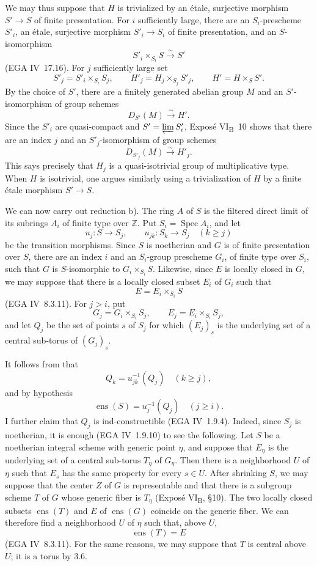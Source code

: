We may thus suppose that \(H\) is trivialized by an étale,
surjective morphism \(S'\to S\) of finite presentation. For \(i\)
sufficiently large, there are an \(S_i\)-prescheme \(S'_i\), an
étale, surjective morphism \(S'_i\to S_i\) of finite presentation,
and an \(S\)-isomorphism
\[
  S'_i\times_{S_i}S\xrightarrow{\sim}S'
\]
(EGA IV~17.16). For \(j\) sufficiently large set
\[
  S'_j=S'_i\times_{S_i}S_j,\qquad
  H'_j=H_j\times_{S_j}S'_j,\qquad
  H'=H\times_S S'.
\]
By the choice of \(S'\), there are a finitely generated abelian
group \(M\) and an \(S'\)-isomorphism of group schemes
\[
  D_{S'}(M)\xrightarrow{\sim}H'.
\]
Since the \(S'_i\) are quasi-compact and
\(S'=\varprojlim S'_i\), Exposé VI\textsubscript{B}~10 shows that
there are an index \(j\) and an \(S'_j\)-isomorphism of group
schemes
\[
  D_{S'_j}(M)\xrightarrow{\sim}H'_j.
\]
This says precisely that \(H_j\) is a quasi-isotrivial group of
multiplicative type. When \(H\) is isotrivial, one argues similarly
using a trivialization of \(H\) by a finite étale morphism
\(S'\to S\).

We can now carry out reduction b). The ring \(A\) of \(S\) is the
filtered direct limit of its subrings \(A_i\) of finite type over
\(\mathbb Z\). Put \(S_i=\operatorname{Spec}A_i\), and let
\[
  u_j:S\longrightarrow S_j,\qquad
  u_{jk}:S_k\longrightarrow S_j\quad(k\geq j)
\]
be the transition morphisms. Since \(S\) is noetherian and \(G\) is
of finite presentation over \(S\), there are an index \(i\) and an
\(S_i\)-group prescheme \(G_i\), of finite type over \(S_i\), such
that \(G\) is \(S\)-isomorphic to \(G_i\times_{S_i}S\). Likewise,
since \(E\) is locally closed in \(G\), we may suppose that there is
a locally closed subset \(E_i\) of \(G_i\) such that
\[
  E=E_i\times_{S_i}S
\]
(EGA IV~8.3.11). For \(j>i\), put
\[
  G_j=G_i\times_{S_i}S_j,\qquad
  E_j=E_i\times_{S_i}S_j,
\]
and let \(Q_j\) be the set of points \(s\) of \(S_j\) for which
\((E_j)_s\) is the underlying set of a central sub-torus of
\((G_j)_s\).

It follows from  that
\[
  Q_k=u_{jk}^{-1}(Q_j)\quad(k\geq j),
\]
and by hypothesis
\[
  \operatorname{ens}(S)=u_j^{-1}(Q_j)\quad(j\geq i).
\]
I further claim that \(Q_j\) is ind-constructible
(EGA IV~1.9.4). Indeed, since \(S_j\) is noetherian, it is enough
(EGA IV~1.9.10) to see the following. Let \(S\) be a noetherian
integral scheme with generic point \(\eta\), and suppose that
\(E_\eta\) is the underlying set of a central sub-torus \(T_\eta\)
of \(G_\eta\). Then there is a neighborhood \(U\) of \(\eta\) such
that \(E_s\) has the same property for every \(s\in U\). After
shrinking \(S\), we may suppose that the center \(Z\) of \(G\) is
representable and that there is a subgroup scheme \(T\) of \(G\)
whose generic fiber is \(T_\eta\)
(Exposé VI\textsubscript{B}, \S10). The two locally closed subsets
\(\operatorname{ens}(T)\) and \(E\) of \(\operatorname{ens}(G)\)
coincide on the generic fiber. We can therefore find a neighborhood
\(U\) of \(\eta\) such that, above \(U\),
\[
  \operatorname{ens}(T)=E
\]
(EGA IV~8.3.11). For the same reasons, we may suppose that \(T\) is
central above \(U\); it is a torus by 3.6.

